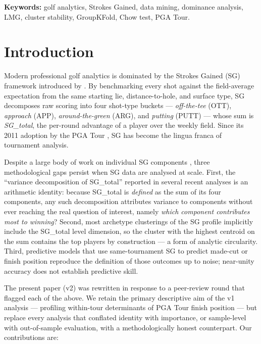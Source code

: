 \documentclass[11pt]{article}
\begin{document}
\noindent\textbf{Keywords:} golf analytics, Strokes Gained, data mining, dominance analysis, LMG, cluster stability, GroupKFold, Chow test, PGA Tour.

\section{Introduction}

Modern professional golf analytics is dominated by the Strokes Gained (SG) framework introduced by \citet{broadie2012assessing,broadie2014every}.  By benchmarking every shot against the field-average expectation from the same starting lie, distance-to-hole, and surface type, SG decomposes raw scoring into four shot-type buckets --- \emph{off-the-tee} (OTT), \emph{approach} (APP), \emph{around-the-green} (ARG), and \emph{putting} (PUTT) --- whose sum is \emph{SG\_total}, the per-round advantage of a player over the weekly field.  Since its 2011 adoption by the PGA Tour \citep{broadie2008pga}, SG has become the lingua franca of tournament analysis.

Despite a large body of work on individual SG components \citep{fearing2011golf,hickman2019driving,lonzani2014strokes}, three methodological gaps persist when SG data are analysed at scale.  First, the ``variance decomposition of SG\_total'' reported in several recent analyses is an arithmetic identity: because SG\_total is \emph{defined} as the sum of its four components, any such decomposition attributes variance to components without ever reaching the real question of interest, namely \emph{which component contributes most to winning}?  Second, most archetype clusterings of the SG profile implicitly include the SG\_total level dimension, so the cluster with the highest centroid on the sum contains the top players by construction --- a form of analytic circularity.  Third, predictive models that use same-tournament SG to predict made-cut or finish position reproduce the definition of those outcomes up to noise; near-unity accuracy does not establish predictive skill.

The present paper (v2) was rewritten in response to a peer-review round that flagged each of the above.  We retain the primary descriptive aim of the v1 analysis --- profiling within-tour determinants of PGA Tour finish position --- but replace every analysis that conflated identity with importance, or sample-level with out-of-sample evaluation, with a methodologically honest counterpart.  Our contributions are:
\end{document}
